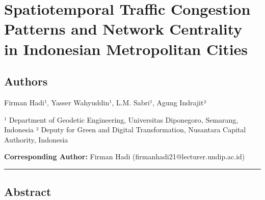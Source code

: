 \documentclass[
  12pt,
]{article}
\author{}
\date{}
\begin{document}
\section{Spatiotemporal Traffic Congestion Patterns and Network Centrality in Indonesian Metropolitan Cities}\label{spatiotemporal-traffic-congestion-patterns-and-network-centrality-in-indonesian-metropolitan-cities}

\subsection{Authors}\label{authors}

Firman Hadi¹, Yasser Wahyuddin¹, L.M. Sabri¹, Agung Indrajit²

¹ Department of Geodetic Engineering, Universitas Diponegoro, Semarang, Indonesia ² Deputy for Green and Digital Transformation, Nusantara Capital Authority, Indonesia

\textbf{Corresponding Author:} Firman Hadi (firmanhadi21@lecturer.undip.ac.id)

\begin{center}\rule{0.5\linewidth}{0.5pt}\end{center}

\subsection{Abstract}\label{abstract}
\end{document}
